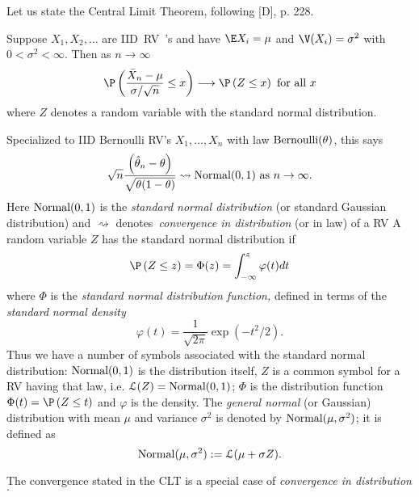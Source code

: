 Let us state the Central Limit Theorem, following [D], p. 228.

\begin{prop}
Suppose $X_{1},X_{2},\ldots $ are IID\ RV\ 's and have $\E X_{i}=\mu $
and $\V(X_{i})=\sigma ^{2}$ with $0<\sigma ^{2}<\infty $. Then as $%
n\rightarrow \infty $%
\begin{equation*}
\P \left( \frac{\bar{X}_{n}-\mu }{\sigma /\sqrt{n}}\leq x\right)
\longrightarrow \P \left( Z\leq x\right) \text{ for all }x
\end{equation*}%
where $Z$ denotes a random variable with the standard normal distribution.
\end{prop}

Specialized to IID Bernoulli RV's $X_{1},\ldots ,X_{n}$ with law $%
\bernoulli(\theta)$, this says 
\begin{equation}
\sqrt{n}\frac{\left( \hat{\theta}_{n}-\theta\right) }{\sqrt{\theta(1-\theta)}}\rightsquigarrow
\mbox{{\rm Normal}}(0,1)\text{ as }n\rightarrow \infty .  \label{specialize-Bern}
\end{equation}%
Here $\mbox{{\rm Normal}}(0,1)$ is the \textit{standard normal distribution} (or standard
Gaussian distribution) and $\rightsquigarrow $ denotes\textit{\ convergence
in distribution} (or in law) of a RV A random variable $Z$ has the
standard normal distribution if 
\begin{equation*}
\P \left( Z\leq z\right) =\Phi (z)=\int_{-\infty }^{z}\varphi (t)dt
\end{equation*}%
where $\Phi $ is the \textit{standard normal distribution function, }defined
in terms of the \textit{standard} \textit{normal density }%
\begin{equation*}
\varphi (t)=\frac{1}{\sqrt{2\pi }}\exp \left( -t^{2}/2\right) .
\end{equation*}%
Thus we have a number of symbols associated with the standard normal
distribution: $\mbox{{\rm Normal}}(0,1)$ is the distribution itself, $Z$ is a common symbol
for a RV having that law, i.e. $\mathcal{L}(Z)=\mbox{{\rm Normal}}(0,1)$; $\Phi $ is the
distribution function $\Phi (t)=\P \left( Z\leq t\right) $ and $\varphi $
is the density. The \textit{general normal} (or Gaussian) distribution with
mean $\mu $ and variance $\sigma ^{2}$ is denoted by $\mbox{{\rm Normal}}(\mu ,\sigma ^{2})$;
it is defined as 
\begin{equation*}
\mbox{{\rm Normal}}(\mu ,\sigma ^{2}):=\mathcal{L}(\mu +\sigma Z).
\end{equation*}

The convergence stated in the CLT is a special case of \textit{convergence
in distribution}$.$

